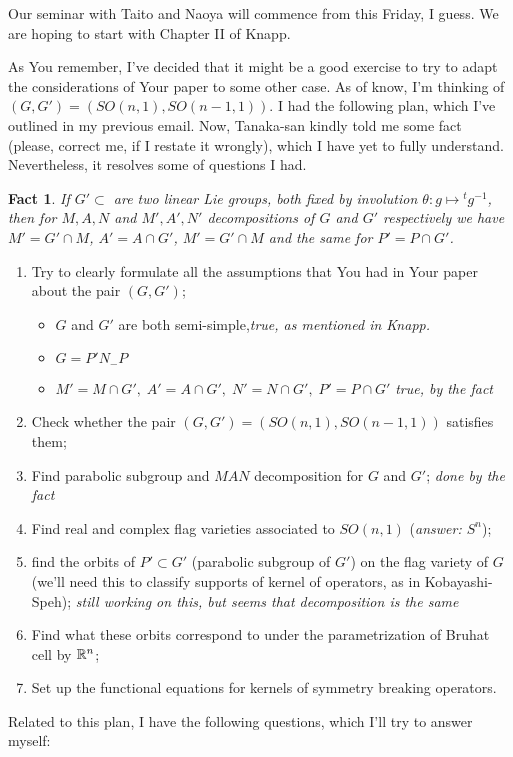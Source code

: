 \documentclass[12pt]{article} %
\newtheorem*{fact}{Fact}
\begin{document}
Our seminar with Taito and Naoya will commence from this Friday, I guess. We are hoping to start with Chapter II of Knapp.

As You remember, I've decided that it might be a good exercise to try to adapt the considerations of Your paper
to some other case. As of know, I'm thinking of $(G,G')=(SO(n,1),SO(n-1,1))$. I had the following plan, which I've
outlined in my previous email. Now, Tanaka-san kindly told me some fact (please, correct me, if I restate it wrongly), which I have yet
to fully understand. Nevertheless, it resolves some of questions I had.
\begin{fact}
	If $G'\subset $ are two linear Lie groups, both fixed by involution $\theta: g\mapsto {^tg^{-1}}$, then for $M,A,N$ and $M',A',N'$
	decompositions of $G$ and $G'$ respectively we have $M'=G'\cap M$, $A'=A\cap G'$, $M'=G'\cap M$ and the same for $P'=P\cap G'$.
\end{fact}
\begin{enumerate}
\item Try to clearly formulate all the assumptions that You had in Your paper about the pair $(G,G')$;
\begin{itemize}
	\item $G$ and $G'$ are both semi-simple,{\it true, as mentioned in Knapp.}
\item $G=P'N_-P$
\item $M'=M\cap G',\;A'=A\cap G',\;N'=N\cap G',\;P'=P\cap G'$ {\it true, by the fact}
\end{itemize}
\item Check whether the pair $(G,G')=(SO(n,1),SO(n-1,1))$ satisfies them;
\item Find parabolic subgroup and $MAN$ decomposition for $G$ and $G'$; {\it done by the fact}
\item Find real and complex flag varieties associated to $SO(n,1)$ (\textit{answer: $S^n$});
\item find the orbits of $P'\subset G'$ (parabolic subgroup of $G'$) on the flag variety of $G$ (we'll need this to classify
supports of kernel of operators, as in Kobayashi-Speh); {\it still working on this, but seems that decomposition is the same}
\item Find what these orbits correspond to under the parametrization of Bruhat cell by $\mathbb{R}^n$;
\item Set up the functional equations for kernels of symmetry breaking operators.
\end{enumerate}
Related to this plan, I have the following questions, which I'll try to answer myself:
\end{document}
